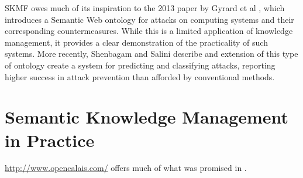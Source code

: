 SKMF owes much of its inspiration to the 2013 paper by Gyrard et al
\cite{ontosec},
which introduces a Semantic Web ontology for attacks on computing systems and their corresponding countermeasures. While this is a limited application of knowledge management, it provides a clear demonstration of the practicality of such systems. More recently, Shenbagam and Salini
\cite{vulncontol}
describe and extension of this type of ontology create a system for predicting and classifying attacks, reporting higher success in attack prevention than afforded by conventional methods.


\section{Semantic Knowledge Management in Practice}
\label{applications}

\url{http://www.opencalais.com/} offers much of what was promised in
\cite{ontoknow}.
